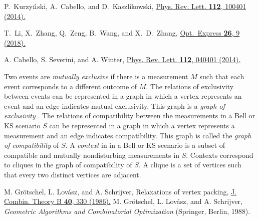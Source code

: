 \documentclass[prl,letterpaper,english,reprint,nofootinbib,aps,superscriptaddress,showpacs,showkeys]{revtex4-1}
\theoremstyle{definition}
\theoremstyle{remark}
\begin{document}
\begin{thebibliography}{10}
P.~Kurzy${\rm \acute{n}}$ski, A.~Cabello, and D.~Kaszlikowski,
 \href{https://journals.aps.org/prl/pdf/10.1103/PhysRevLett.112.100401}
{Phys. Rev. Lett. \textbf{112}, 100401 (2014).}


T.~Li, X.~Zhang, Q.~Zeng, B.~Wang, and X.~D.~Zhang,
\href{https://www.osapublishing.org/DirectPDFAccess/75609127-9CAD-CE26-93F0FBF2C26787E3_385890/oe-26-9-11959.pdf?da=1&id=385890&seq=0&mobile=no}
{Opt.~Express \textbf{26}, 9 (2018).}





 A. Cabello, S. Severini, and A. Winter,
 \href{http://journals.aps.org/prl/abstract/10.1103/PhysRevLett.112.040401}{Phys. Rev. Lett. \textbf{112}, 040401 (2014).}

Two events are {\em mutually exclusive} if there is a measurement $M$ such that each event corresponds to a different outcome of $M$.
The relations of exclusivity between events can be represented in a graph in which a vertex represents an event and an edge indicates mutual exclusivity. This graph is a {\em graph of exclusivity} \cite{CSW14}.
The relations of compatibility between the measurements in a Bell or KS scenario $S$ can be represented in a graph in which a vertex represents a measurement and an edge indicates compatibility. This graph is called the {\em graph of compatibility} of $S$. A {\em context} in in a Bell or KS scenario is a subset of compatible and mutually nondisturbing measurements in $S$. Contexts correspond to cliques in the graph of compatibility of $S$. A clique is a set of vertices such that every two distinct vertices are adjacent.


 M. Gr\"otschel, L. Lov\'asz, and A. Schrijver, Relaxations of vertex packing, \href{https://doi.org/10.1016/0095-8956(86)90087-0}{J. Combin. Theory B \textbf{40}, 330 (1986).}
 M. Gr\"otschel, L. Lov\'asz, and A. Schrijver, {\em Geometric Algorithms and Combinatorial Optimization} (Springer, Berlin, 1988).


\end{thebibliography}
\end{document}
